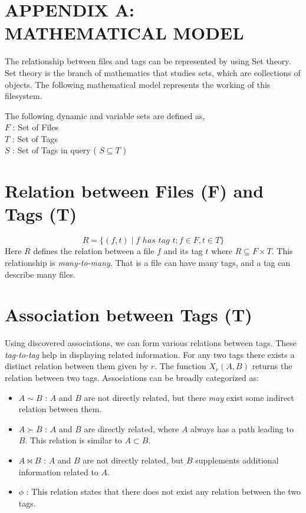 \section*{APPENDIX A: MATHEMATICAL MODEL}

The relationship between files and tags can be represented by using Set theory. Set theory is the branch of mathematics that studies sets, which are collections of objects. The following mathematical model represents the working of this filesystem. 

\noindent The following dynamic and variable sets are defined as, \\
\indent $F$	: Set of Files \\
\indent $T$	: Set of Tags \\
\indent $S$	: Set of Tags in query ( $S \subseteq T$ ) \\

\section{Relation between Files (F) and Tags (T)}
$$ R = \{(f,t) \mid f \,\, has \,\, tag \,\,t; f \in F, t \in T\}$$
Here $R$ defines the relation between a file $f$ and its tag $t$ where $R \subseteq F \times T$. This relationship is \emph{many-to-many}. 
That is a file can have many tags, and a tag can describe many files.

\section{Association between Tags (T)}
Using discovered associations, we can form various relations between tags. These \emph{tag-to-tag} help in displaying related information. For any two tags there exists a distinct relation between them given by $r$. The function $X_{r}(A,B)$ returns the relation between two tags. Associations can be broadly categorized as:
\begin{itemize}
\item {$A \sim B$} : $A$ and $B$ are not directly related, but there \emph{may} exist some indirect relation between them.
\item $A \succ B$ : $A$ and $B$ are directly related, where $A$ always has a path leading to $B$. This relation is similar to $A \subset B$.
\item $A \bowtie B$ : $A$ and $B$ are not directly related, but $B$ supplements additional information related to $A$.
\item $\phi$ : This relation states that there does not exist any relation between the two tags.
\end{itemize}

